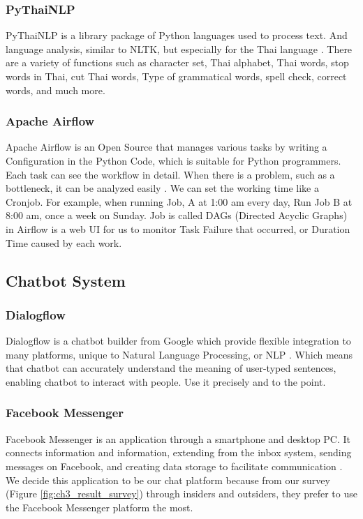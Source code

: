 \documentclass[12pt,oneside,openright,a4paper]{cpe-english-project}
\begin{document}
\subsubsection{PyThaiNLP}
PyThaiNLP is a library package of Python languages used to process text. And language analysis,
similar to NLTK, but especially for the Thai language \cite{pythainlp}.
There are a variety of functions such as character set, Thai alphabet, Thai words,
stop words in Thai, cut Thai words, Type of grammatical words, spell check, correct words,
and much more.

\subsubsection{Apache Airflow}
Apache Airflow is an Open Source that manages various tasks by writing a Configuration in
the Python Code, which is suitable for Python programmers. Each task can see the workflow
in detail. When there is a problem, such as a bottleneck, it can be analyzed easily \cite{apache_airflow}.
We can set the working time like a Cronjob. For example, when running Job, A at 1:00 am
every day, Run Job B at 8:00 am, once a week on Sunday. Job is called DAGs
(Directed Acyclic Graphs) in Airflow is a web UI for us to monitor Task Failure
that occurred, or Duration Time caused by each work.

\subsection{Chatbot System}
\subsubsection{Dialogflow}
Dialogflow is a chatbot builder from Google which provide flexible integration to many platforms,
unique to Natural Language Processing, or NLP \cite{dialogflow}. Which means that chatbot can
accurately understand the meaning of user-typed sentences, enabling chatbot to interact with people.
Use it precisely and to the point.

\subsubsection{Facebook Messenger}
Facebook Messenger is an application through a smartphone and desktop PC. It connects information
and information, extending from the inbox system, sending messages on Facebook, and creating data
storage to facilitate communication \cite{wiki_fb_messenger}.\\
We decide this application to be our chat platform because from our survey (Figure \ref*{fig:ch3_result_survey})
through insiders and outsiders, they prefer to use the Facebook Messenger platform the most.
\end{document}
